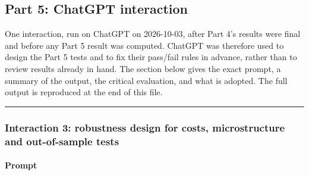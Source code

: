 \hypertarget{part-5-chatgpt-interaction}{%
\subsection{Part 5: ChatGPT interaction}\label{part-5-chatgpt-interaction}}

One interaction, run on ChatGPT on 2026-10-03, after Part 4's results were final and
before any Part 5 result was computed. ChatGPT was therefore used to
design the Part 5 tests and to fix their pass/fail rules in advance, rather than to review
results already in hand. The section below gives the exact prompt, a summary of the output,
the critical evaluation, and what is adopted. The full output is reproduced at the end of
this file.

\begin{center}\rule{0.5\linewidth}{0.5pt}\end{center}

\hypertarget{interaction-3-robustness-design-for-costs-microstructure-and-out-of-sample-tests}{%
\subsubsection{Interaction 3: robustness design for costs, microstructure and out-of-sample tests}\label{interaction-3-robustness-design-for-costs-microstructure-and-out-of-sample-tests}}

\hypertarget{prompt}{%
\paragraph{Prompt}\label{prompt}}

